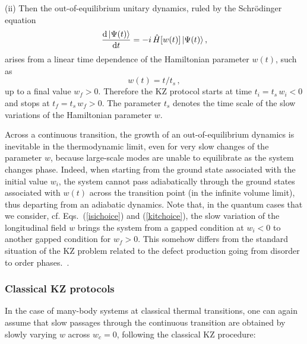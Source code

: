 (ii) Then the out-of-equilibrium unitary dynamics, ruled by the
Schr\"odinger equation
  \begin{equation}
    {{\rm d} \, |\Psi(t)\rangle \over {\rm d} t} =
    - i \, \hat H[w(t)] \, |\Psi(t)\rangle \,,
    \label{unitdyn}
  \end{equation}
  arises from a linear time dependence of the Hamiltonian parameter
  $w(t)$, such as
  \begin{equation}
    w(t) = t/t_s \,,
    \label{wtkz}
  \end{equation}
  up to a final value $w_f>0$. Therefore the KZ protocol starts at
  time $t_i = t_s \, w_i<0$ and stops at $t_f= t_s \, w_f>0$.  The
  parameter $t_s$ denotes the time scale of the slow variations of the
  Hamiltonian parameter $w$.

Across a continuous transition, the growth of an out-of-equilibrium
dynamics is inevitable in the thermodynamic limit, even for very slow
changes of the parameter $w$, because large-scale modes are unable to
equilibrate as the system changes phase. Indeed, when starting from
the ground state associated with the initial value $w_i$, the system
cannot pass adiabatically through the ground states associated with
$w(t)$ across the transition point (in the infinite volume limit),
thus departing from an adiabatic dynamics.  Note that, in the quantum
cases that we consider, cf. Eqs.~(\ref{isichoice}) and
(\ref{kitchoice}), the slow variation of the longitudinal field $w$
brings the system from a gapped condition at $w_i<0$ to another gapped
condition for $w_f>0$. This somehow differs from the standard
situation of the KZ problem related to the defect production going
from disorder to order phases.~\cite{kibble1976topology, kibble1980some, zurek1985cosmological,
  zurek1996cosmological, zurek2005dynamics, polkovnikov2005universal, dziarmaga2005dynamics, PG-08, dziarmaga2010dynamics,
  Dutta-etal-book, chandran2012kibble}.







\subsubsection{Classical KZ protocols}
\label{cloneway}

In the case of many-body systems at classical thermal transitions, one
can again assume that slow passages through the continuous transition
are obtained by slowly varying $w$ across $w_c = 0$, following the 
classical KZ procedure:

